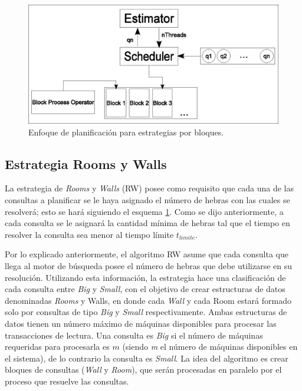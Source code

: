 \begin{figure}[!th]
\centering
\includegraphics[scale=.75]{images/scheduler_bloques.eps}
\caption{Enfoque de planificación para estrategias por bloques.}
\label{fig:schedulerbloques}
\end{figure}  


\subsection{Estrategia Rooms y Walls}
\label{scheduling:fr}
La estrategia de \textit{Rooms} y \textit{Walls} (RW) posee como requisito que cada una de las consultas a planificar se le haya asignado el número de hebras con las cuales se resolverá; esto se hará siguiendo el esquema \ref{fig:schedulerbloques}. Como se dijo anteriormente, a cada consulta se le asignará la cantidad mínima de hebras tal que el tiempo en resolver la consulta sea menor al tiempo límite $t_{limite}$.

Por lo explicado anteriormente, el algoritmo RW asume que cada consulta que llega al motor de búsqueda posee el número de hebras que debe utilizarse en su resolución. Utilizando esta información, la estrategia hace una clasificación de cada consulta entre \textit{Big} y \textit{Small}, con el objetivo de crear estructuras de datos denominadas \textit{Rooms} y {Walls}, en donde cada \textit{Wall} y cada {Room} estará formado solo por consultas de tipo \textit{Big} y \textit{Small} respectivamente. Ambas estructuras de datos tienen un número máximo de máquinas disponibles para procesar las transacciones de lectura. Una consulta es \textit{Big} si el número de máquinas requeridas para procesarla es $m$ (siendo \textit{m} el número de máquinas disponibles en el sistema), de lo contrario la consulta es \textit{Small}. La idea del algoritmo es crear bloques de consultas (\textit{Wall} y \textit{Room}), que serán procesadas en paralelo por el proceso que resuelve las consultas. 

